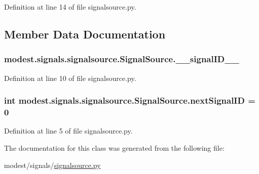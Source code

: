 Definition at line 14 of file signalsource.\+py.



\subsection{Member Data Documentation}
\subsubsection[{\texorpdfstring{\+\_\+\+\_\+signal\+I\+D\+\_\+\+\_\+}{__signalID__}}]{\setlength{\rightskip}{0pt plus 5cm}modest.\+signals.\+signalsource.\+Signal\+Source.\+\_\+\+\_\+signal\+I\+D\+\_\+\+\_\+\hspace{0.3cm}{\ttfamily [private]}}\hypertarget{classmodest_1_1signals_1_1signalsource_1_1SignalSource_a8b8d7f422fe4de0e2f0add245c05b3c1}{}\label{classmodest_1_1signals_1_1signalsource_1_1SignalSource_a8b8d7f422fe4de0e2f0add245c05b3c1}


Definition at line 10 of file signalsource.\+py.

\subsubsection[{\texorpdfstring{next\+Signal\+ID}{nextSignalID}}]{\setlength{\rightskip}{0pt plus 5cm}int modest.\+signals.\+signalsource.\+Signal\+Source.\+next\+Signal\+ID = 0\hspace{0.3cm}{\ttfamily [static]}}\hypertarget{classmodest_1_1signals_1_1signalsource_1_1SignalSource_a453eafb550b551adbec0903deb63dfce}{}\label{classmodest_1_1signals_1_1signalsource_1_1SignalSource_a453eafb550b551adbec0903deb63dfce}


Definition at line 5 of file signalsource.\+py.



The documentation for this class was generated from the following file\+:\begin{DoxyCompactItemize}
\item 
modest/signals/\hyperlink{signalsource_8py}{signalsource.\+py}\end{DoxyCompactItemize}
